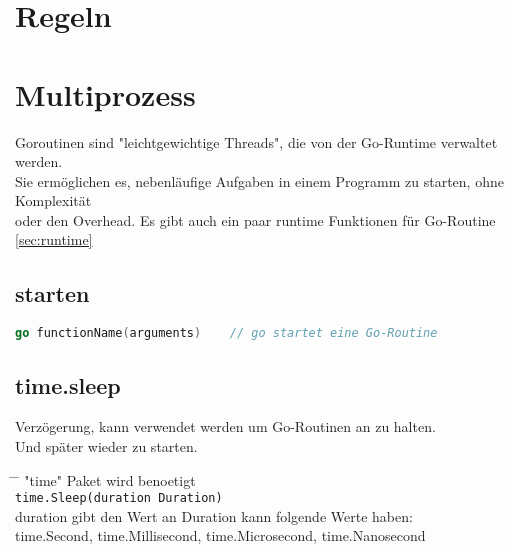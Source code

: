 \documentclass[twoside,a4paper,12pt]{article}
\begin{document}
\section{Regeln}

\section{Multiprozess}
Goroutinen sind "leichtgewichtige Threads", die von der Go-Runtime verwaltet werden. \\ 
Sie ermöglichen es, nebenläufige Aufgaben in einem Programm zu starten, ohne Komplexität \\ 
oder den Overhead. Es gibt auch ein paar runtime Funktionen für Go-Routine \ref{sec:runtime} \\ 
\subsection{starten}
\begin{center}
  \begin{minipage}{1.0\textwidth}
    \begin{lstlisting}[language=Go]
    go functionName(arguments)    // go startet eine Go-Routine 
    \end{lstlisting}
  \end{minipage}
\end{center}

\subsection{time.sleep}
Verzögerung, kann verwendet werden um Go-Routinen an zu halten. \\ 
Und später wieder zu starten.
\begin{tabbing}
 \hspace{2mm} \= \hspace{50mm} \= \kill
 \> "time" \> Paket wird benoetigt \\
 \> \verb|time.Sleep(duration Duration)| \\ 
 \> duration gibt den Wert an Duration kann folgende Werte haben: \\ 
 \> time.Second, time.Millisecond, time.Microsecond, time.Nanosecond \\ 
\end{tabbing}

\newpage
\end{document}
